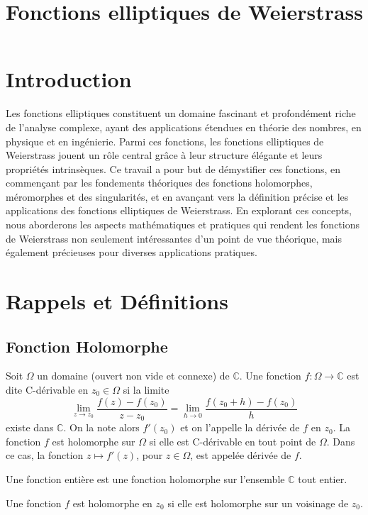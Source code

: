 \documentclass[12pt]{article}
\title{Fonctions elliptiques de Weierstrass}
\author{}
\date{}
\begin{document}
\maketitle
\newpage
\tableofcontents
\newpage

\section*{Introduction}
Les fonctions elliptiques constituent un domaine fascinant et profondément riche de l'analyse complexe, ayant des applications étendues en théorie des nombres,
en physique et en ingénierie. Parmi ces fonctions, les fonctions elliptiques de Weierstrass jouent un rôle central grâce à leur structure élégante et leurs
propriétés intrinsèques. Ce travail a pour but de démystifier ces fonctions, en commençant par les fondements théoriques des fonctions holomorphes, méromorphes
et des singularités, et en avançant vers la définition précise et les applications des fonctions elliptiques de Weierstrass. En explorant ces concepts, nous
aborderons les aspects mathématiques et pratiques qui rendent les fonctions de Weierstrass non seulement intéressantes d'un point de vue théorique, mais également
précieuses pour diverses applications pratiques.

\newpage
\section{Rappels et Définitions}

\subsection{Fonction Holomorphe}
Soit $\Omega$ un domaine (ouvert non vide et connexe) de $\mathbb{C}$. Une fonction $f : \Omega \to \mathbb{C}$ est dite C-dérivable en $z_0 \in \Omega$ si la limite
\[
\lim_{z \to z_0} \frac{f(z) - f(z_0)}{z - z_0} = \lim_{h \to 0} \frac{f(z_0 + h) - f(z_0)}{h}
\]
existe dans $\mathbb{C}$. On la note alors $f'(z_0)$ et on l’appelle la dérivée de $f$ en $z_0$. La fonction $f$ est holomorphe sur $\Omega$ si elle est C-dérivable en tout point de $\Omega$. Dans ce cas, la fonction $z \mapsto f'(z)$, pour $z \in \Omega$, est appelée dérivée de $f$.

Une fonction entière est une fonction holomorphe sur l’ensemble $\mathbb{C}$ tout entier.

Une fonction $f$ est holomorphe en $z_0$ si elle est holomorphe sur un voisinage de $z_0$.\\
\end{document}
